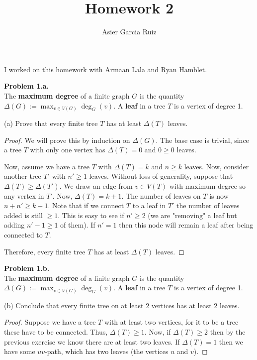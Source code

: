 \documentclass{article}
\title{Homework 2}
\author{Asier Garcia Ruiz}
\newenvironment{hwproof}[2]
{
    \textbf{Problem #1.}\\
    #2
    \begin{proof}
}{
    \end{proof}
    \newpage
}
\begin{document}
\maketitle

I worked on this homework with Armaan Lala and Ryan Hamblet.

\begin{hwproof}
    {1.a}
    {
        The \textbf{maximum degree} of a finite graph $G$ is the quantity
        $\Delta(G) := \max_{v\in V(G)}\deg_G(v)$. A \textbf{leaf} in a tree $T$
        is a vertex of degree 1.

        (a) Prove that every finite tree $T$ has at least $\Delta(T)$ leaves.
    }
    We will prove this by induction on $\Delta(G)$. The base case is trivial,
    since a tree $T$ with only one vertex has $\Delta(T) = 0$ and $0 \geq 0$ leaves.

    Now, assume we have a tree $T$ with $\Delta(T) = k$ and $n \geq k$ leaves. Now, consider
    another tree $T'$ with $n' \geq 1$ leaves. Without loss of generality,
    suppose that $\Delta(T) \geq \Delta(T')$. We draw an edge from $v \in V(T)$ with
    maximum degree so any vertex in $T'$. Now, $\Delta(T) = k + 1$. The number of
    leaves on $T$ is now $n + n' \geq k + 1$. Note that if we connect $T$ to a leaf
    in $T'$ the number of leaves added is still $\geq 1$. This is easy to see if
    $n' \geq 2$ (we are "removing" a leaf but adding $n' - 1 \geq 1$ of them).
    If $n' = 1$ then this node will remain a leaf after being connected to $T$.

    Therefore, every finite tree $T$ has at least $\Delta(T)$ leaves.
\end{hwproof}

\begin{hwproof}
    {1.b}
    {
        The \textbf{maximum degree} of a finite graph $G$ is the quantity
        $\Delta(G) := \max_{v\in V(G)}\deg_G(v)$. A \textbf{leaf} in a tree $T$
        is a vertex of degree 1.

        (b) Conclude that every finite tree on at least 2 vertices has at least
        2 leaves.
    }
    Suppose we have a tree $T$ with at least two vertices, for it to be a tree
    these have to be connected. Thus, $\Delta(T) \geq 1$. Now, if
    $\Delta(T) \geq 2$ then by the previous exercise we know there are at least
    two leaves. If $\Delta(T) = 1$ then we have some $uv$-path, which has two leaves
    (the vertices $u$ and $v$).
\end{hwproof}
\end{document}
